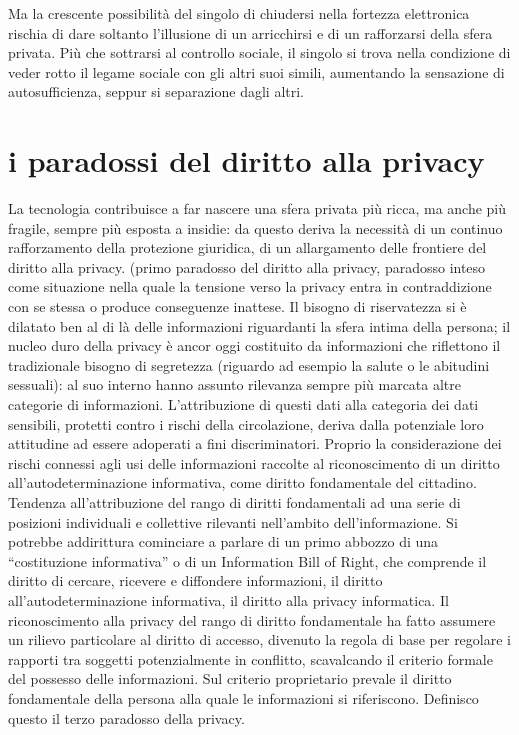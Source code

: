 Ma la crescente possibilità del singolo di chiudersi nella fortezza elettronica rischia di dare soltanto l’illusione di un arricchirsi e di un rafforzarsi della sfera privata. Più che sottrarsi al controllo sociale, il singolo si trova nella condizione di veder rotto il legame sociale con gli altri suoi simili, aumentando la sensazione di autosufficienza, seppur si separazione dagli altri.
\section{i paradossi del diritto alla privacy}%
La tecnologia contribuisce a far nascere una sfera privata più ricca, ma anche più fragile, sempre più esposta a insidie: da questo deriva la necessità di un continuo rafforzamento della protezione giuridica, di un allargamento delle frontiere del diritto alla privacy. (primo paradosso del diritto alla privacy, paradosso inteso come situazione nella quale la tensione verso la privacy entra in contraddizione con se stessa o produce conseguenze inattese.
Il bisogno di riservatezza si è dilatato ben al di là delle informazioni riguardanti la sfera intima della persona; il nucleo duro della privacy è ancor oggi costituito da informazioni che riflettono il tradizionale bisogno di segretezza (riguardo ad esempio la salute o le abitudini sessuali): al suo interno hanno assunto rilevanza sempre più marcata altre categorie di informazioni.
L’attribuzione di questi dati alla categoria dei dati sensibili, protetti contro i rischi della circolazione, deriva dalla potenziale loro attitudine ad essere adoperati a fini discriminatori. Proprio la considerazione dei rischi connessi agli usi delle informazioni raccolte al riconoscimento di un diritto all’autodeterminazione informativa, come diritto fondamentale del cittadino.
Tendenza all’attribuzione del rango di diritti fondamentali ad una serie di posizioni individuali e collettive rilevanti nell’ambito dell’informazione. Si potrebbe addirittura cominciare a parlare di un primo abbozzo di una “costituzione informativa” o di un Information Bill of Right, che comprende il diritto di cercare, ricevere e diffondere informazioni, il diritto all’autodeterminazione informativa, il diritto alla privacy informatica.
Il riconoscimento alla privacy del rango di diritto fondamentale ha fatto assumere un rilievo particolare al diritto di accesso, divenuto la regola di base per regolare i rapporti tra soggetti potenzialmente in conflitto, scavalcando il criterio formale del possesso delle informazioni. Sul criterio proprietario prevale il diritto fondamentale della persona alla quale le informazioni si riferiscono. Definisco questo il terzo paradosso della privacy.
